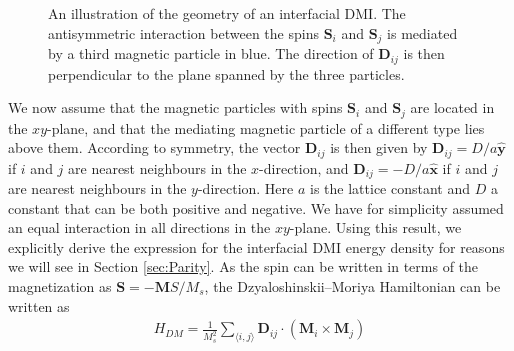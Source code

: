 \begin{figure}[h!]
\centering
{}
        \caption{An illustration of the geometry of an interfacial DMI. The antisymmetric interaction between the spins $\mathbold{S}_i$ and $\mathbold{S}_j$ is mediated by a third magnetic particle in blue. The direction of $\mathbold{D}_{ij}$ is then perpendicular to the plane spanned by the three particles.}
        \label{fig:InterfacialDMI}
\end{figure}
We now assume that the magnetic particles with spins $\mathbold{S}_i$ and $\mathbold{S}_j$ are located in the $xy$-plane, and that the mediating magnetic particle of a different type lies above them. According to symmetry, the vector $\mathbold{D}_{ij}$ is then given by $\mathbold{D}_{ij} = D/a\mathbold{\hat{y}}$ if $i$ and $j$ are nearest neighbours in the $x$-direction, and $\mathbold{D}_{ij} = -D/a\mathbold{\hat{x}}$ if $i$ and $j$ are nearest neighbours in the $y$-direction. Here $a$ is the lattice constant and $D$ a constant that can be both positive and negative. We have for simplicity assumed an equal interaction in all directions in the $xy$-plane. Using this result, we explicitly derive the expression for the interfacial DMI energy density for reasons we will see in Section \ref{sec:Parity}. As the spin can be written in terms of the magnetization as $\mathbold{S} = -\mathbold{M}S/M_s$, the Dzyaloshinskii--Moriya Hamiltonian can be written as
\begin{align}
    H_{DM} = \frac{1}{M_s^2}\sum_{\langle i,j\rangle} \mathbold{D}_{ij}\cdot\left( \mathbold{M}_i\times\mathbold{M}_j\right)
\end{align}
